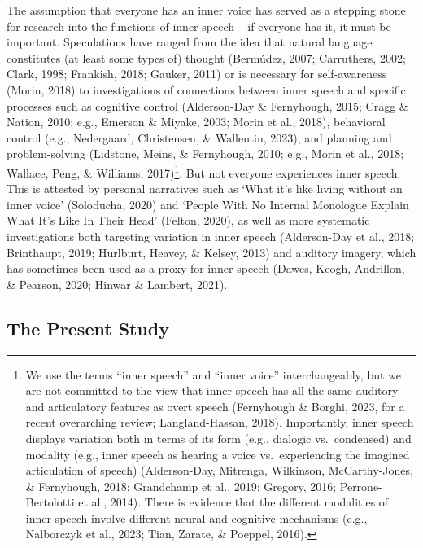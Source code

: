 \documentclass[
  man,a4paper,floatsintext]{apa6}
\begin{document}
The assumption that everyone has an inner voice has served as a stepping stone for research into the functions of inner speech -- if everyone has it, it must be important. Speculations have ranged from the idea that natural language constitutes (at least some types of) thought (Bermúdez, 2007; Carruthers, 2002; Clark, 1998; Frankish, 2018; Gauker, 2011) or is necessary for self-awareness (Morin, 2018) to investigations of connections between inner speech and specific processes such as cognitive control (Alderson-Day \& Fernyhough, 2015; Cragg \& Nation, 2010; e.g., Emerson \& Miyake, 2003; Morin et al., 2018), behavioral control (e.g., Nedergaard, Christensen, \& Wallentin, 2023), and planning and problem-solving (Lidstone, Meins, \& Fernyhough, 2010; e.g., Morin et al., 2018; Wallace, Peng, \& Williams, 2017)\footnote{We use the terms ``inner speech'' and ``inner voice'' interchangeably, but we are not committed to the view that inner speech has all the same auditory and articulatory features as overt speech (Fernyhough \& Borghi, 2023, for a recent overarching review; Langland-Hassan, 2018). Importantly, inner speech displays variation both in terms of its form (e.g., dialogic vs.~condensed) and modality (e.g., inner speech as hearing a voice vs.~experiencing the imagined articulation of speech) (Alderson-Day, Mitrenga, Wilkinson, McCarthy-Jones, \& Fernyhough, 2018; Grandchamp et al., 2019; Gregory, 2016; Perrone-Bertolotti et al., 2014). There is evidence that the different modalities of inner speech involve different neural and cognitive mechanisms (e.g., Nalborczyk et al., 2023; Tian, Zarate, \& Poeppel, 2016).}. But not everyone experiences inner speech. This is attested by personal narratives such as `What it's like living without an inner voice' (Soloducha, 2020) and `People With No Internal Monologue Explain What It's Like In Their Head' (Felton, 2020), as well as more systematic investigations both targeting variation in inner speech (Alderson-Day et al., 2018; Brinthaupt, 2019; Hurlburt, Heavey, \& Kelsey, 2013) and auditory imagery, which has sometimes been used as a proxy for inner speech (Dawes, Keogh, Andrillon, \& Pearson, 2020; Hinwar \& Lambert, 2021).

\hypertarget{the-present-study}{%
\subsection{The Present Study}\label{the-present-study}}
\end{document}
